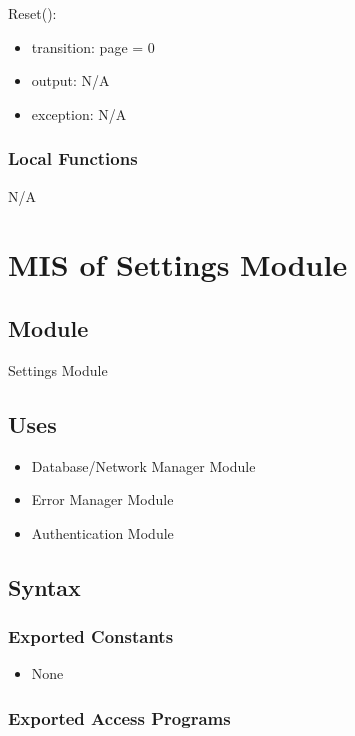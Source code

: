 \documentclass[12pt, titlepage]{article}
\begin{document}
\noindent Reset():
\begin{itemize}
\item transition: page = 0 
\item output: N/A
\item exception: N/A
\end{itemize}

\subsubsection{Local Functions}

N/A

\newpage

\section{MIS of Settings Module} \label{Module_Settings}

\subsection{Module}

Settings Module

\subsection{Uses}

\begin{itemize}
  \item Database/Network Manager Module
  \item Error Manager Module
  \item Authentication Module
\end{itemize}

\subsection{Syntax}

\subsubsection{Exported Constants}

\begin{itemize}
  \item None
\end{itemize}

\subsubsection{Exported Access Programs}
\end{document}
